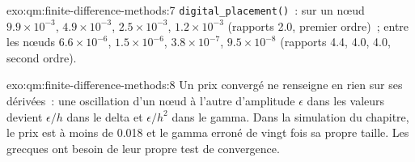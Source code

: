 \begin{solution}{exo:qm:finite-difference-methods:7}
\texttt{digital\_placement()}~: sur un nœud $9.9 \times 10^{-3}$, $4.9 \times 10^{-3}$, $2.5 \times 10^{-3}$, $1.2 \times 10^{-3}$ (rapports 2.0, premier ordre)~; entre les nœuds $6.6 \times 10^{-6}$, $1.5 \times 10^{-6}$,
$3.8 \times 10^{-7}$, $9.5 \times 10^{-8}$ (rapports 4.4, 4.0, 4.0, second ordre).
\end{solution}

\begin{solution}{exo:qm:finite-difference-methods:8}
Un prix convergé ne renseigne en rien sur ses dérivées~: une oscillation d'un nœud à l'autre d'amplitude $\epsilon$ dans les valeurs devient $\epsilon/h$ dans le delta et $\epsilon/h^2$ dans le gamma. Dans la simulation du chapitre, le prix est à moins de
0.018 et le gamma erroné de vingt fois sa propre taille. Les grecques ont besoin de leur propre test de convergence.
\end{solution}

